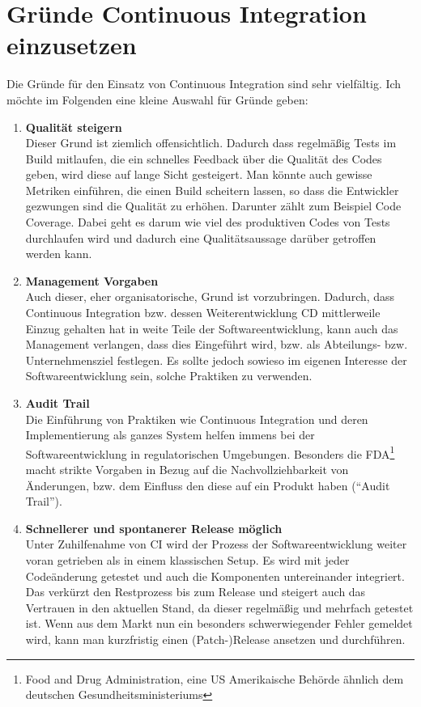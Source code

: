 \section{Gründe Continuous Integration einzusetzen}\label{sec:Gründe Continuous Integration einzusetzen}
Die Gründe für den Einsatz von Continuous Integration sind sehr vielfältig. Ich möchte im Folgenden eine kleine Auswahl für Gründe geben:
\begin{enumerate}
	\item \textbf{Qualität steigern}\\
	Dieser Grund ist ziemlich offensichtlich. Dadurch dass regelmäßig Tests im Build mitlaufen, die ein schnelles Feedback über die Qualität des Codes geben, wird diese auf lange Sicht gesteigert. Man könnte auch gewisse Metriken einführen, die einen Build scheitern lassen, so dass die Entwickler gezwungen sind die Qualität zu erhöhen. Darunter zählt zum Beispiel Code Coverage. Dabei geht es darum wie viel des produktiven Codes von Tests durchlaufen wird und dadurch eine Qualitätsaussage darüber getroffen werden kann.
	\item \textbf{Management Vorgaben}\\
	Auch dieser, eher organisatorische, Grund ist vorzubringen. Dadurch, dass Continuous Integration bzw. dessen Weiterentwicklung CD mittlerweile Einzug gehalten hat in weite Teile der Softwareentwicklung, kann auch das Management verlangen, dass dies Eingeführt wird, bzw. als Abteilungs- bzw. Unternehmensziel festlegen. Es sollte jedoch sowieso im eigenen Interesse der Softwareentwicklung sein, solche Praktiken zu verwenden.
	\item \textbf{Audit Trail}\\
	Die Einführung von Praktiken wie Continuous Integration und deren Implementierung als ganzes System helfen immens bei der Softwareentwicklung in regulatorischen Umgebungen. Besonders die FDA\footnote{Food and Drug Administration, eine US Amerikaische Behörde ähnlich dem deutschen Gesundheitsministeriums} macht strikte Vorgaben in Bezug auf die Nachvollziehbarkeit von Änderungen, bzw. dem Einfluss den diese auf ein Produkt haben ("`Audit Trail"').
	\item \textbf{Schnellerer und spontanerer Release möglich}\\
	Unter Zuhilfenahme von CI wird der Prozess der Softwareentwicklung weiter voran getrieben als in einem klassischen Setup. Es wird mit jeder Codeänderung getestet und auch die Komponenten untereinander integriert. Das verkürzt den Restprozess bis zum Release und steigert auch das Vertrauen in den aktuellen Stand, da dieser regelmäßig und mehrfach getestet ist. Wenn aus dem Markt nun ein besonders schwerwiegender Fehler gemeldet wird, kann man kurzfristig einen (Patch-)Release ansetzen und durchführen.

\end{enumerate}
